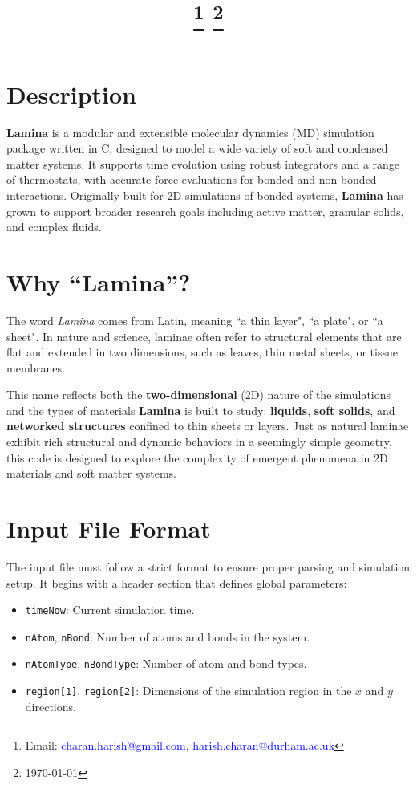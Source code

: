 \documentclass[a4paper,10pt]{article}
\title{\vspace{-1.0cm}{\large{\textbf{\textcolor{Mahogany}{Lamina} - A 2D Molecular Dynamics Simulator}\\
\textbf{Harish Charan, {\sf Durham University, Durham, UK}}}}%
\thanks{\textsf{Email: \textcolor{Blue}{charan.harish@gmail.com, harish.charan@durham.ac.uk}}}
\thanks{\textsf{\textcolor{Mahogany}{\today}}}%
}
\date{} %
\begin{document}
\maketitle

\section*{Description}

\textbf{Lamina} is a modular and extensible molecular dynamics (MD) simulation package written in C, designed to model 
a wide variety of soft and condensed matter systems. It supports time evolution using robust integrators and a range of 
thermostats, with accurate force evaluations for bonded and non-bonded interactions. Originally built for 2D simulations 
of bonded systems, \textbf{Lamina} has grown to support broader research goals including active matter, granular solids, 
and complex fluids.

\section*{Why ``Lamina''?}

The word \textit{Lamina} comes from Latin, meaning ``a thin layer", ``a plate", or ``a sheet". In nature and science, 
laminae often refer to structural elements that are flat and extended in two dimensions, such as leaves, thin metal 
sheets, or tissue membranes.

This name reflects both the \textbf{two-dimensional} (2D) nature of the simulations and the types of materials 
\textbf{Lamina} is built to study: \textbf{liquids}, \textbf{soft solids}, and \textbf{networked structures} confined to 
thin sheets or layers. Just as natural laminae exhibit rich structural and dynamic behaviors in a seemingly simple 
geometry, this code is designed to explore the complexity of emergent phenomena in 2D materials and soft matter systems.

\section*{Input File Format}

The input file must follow a strict format to ensure proper parsing and simulation setup. It begins with a header section 
that defines global parameters:

\begin{itemize}
  \item \texttt{timeNow}: Current simulation time.
  \item \texttt{nAtom}, \texttt{nBond}: Number of atoms and bonds in the system.
  \item \texttt{nAtomType}, \texttt{nBondType}: Number of atom and bond types.
  \item \texttt{region[1]}, \texttt{region[2]}: Dimensions of the simulation region in the \(x\) and \(y\) directions.
\end{itemize}
\end{document}
